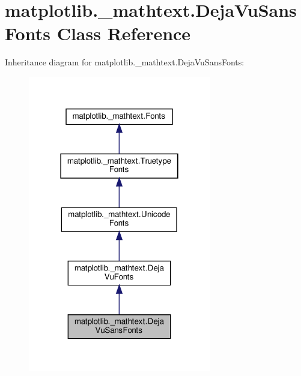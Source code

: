 \hypertarget{classmatplotlib_1_1__mathtext_1_1DejaVuSansFonts}{}\section{matplotlib.\+\_\+mathtext.\+Deja\+Vu\+Sans\+Fonts Class Reference}
\label{classmatplotlib_1_1__mathtext_1_1DejaVuSansFonts}


Inheritance diagram for matplotlib.\+\_\+mathtext.\+Deja\+Vu\+Sans\+Fonts\+:
\nopagebreak
\begin{figure}[H]
\begin{center}
\leavevmode
\includegraphics[width=226pt]{classmatplotlib_1_1__mathtext_1_1DejaVuSansFonts__inherit__graph}
\end{center}
\end{figure}


